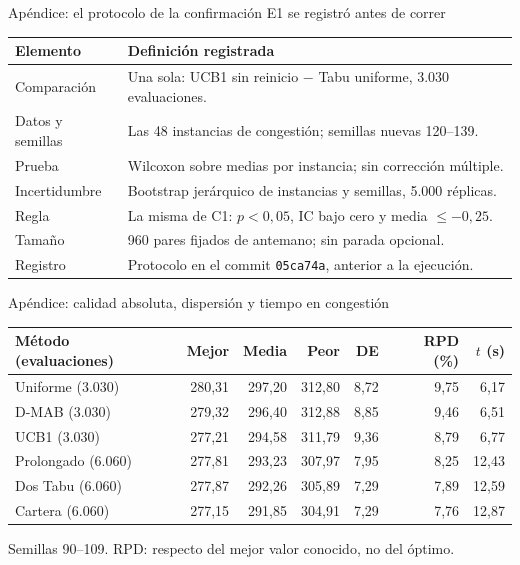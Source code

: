 \documentclass[aspectratio=169,11pt]{beamer}
\begin{document}
\begin{frame}{Apéndice: el protocolo de la confirmación E1 se registró antes de correr}
  \centering\footnotesize
  \begin{tabular}{@{}p{}p{}@{}}
    \toprule
    Elemento & Definición registrada\\
    \midrule
    Comparación & Una sola: UCB1 sin reinicio $-$ Tabu uniforme, 3.030 evaluaciones.\\
    Datos y semillas & Las 48 instancias de congestión; semillas nuevas 120--139.\\
    Prueba & Wilcoxon sobre medias por instancia; sin corrección múltiple.\\
    Incertidumbre & Bootstrap jerárquico de instancias y semillas, 5.000 réplicas.\\
    Regla & La misma de C1: $p<0{,}05$, IC bajo cero y media $\le -0{,}25$.\\
    Tamaño & 960 pares fijados de antemano; sin parada opcional.\\
    Registro & Protocolo en el commit \texttt{05ca74a}, anterior a la ejecución.\\
    \bottomrule
  \end{tabular}
\end{frame}

\begin{frame}{Apéndice: calidad absoluta, dispersión y tiempo en congestión}
  \centering\footnotesize
  \begin{tabular}{@{}lrrrrrr@{}}
    \toprule
    Método (evaluaciones) & Mejor & Media & Peor & DE & RPD (\%) & $t$ (s)\\
    \midrule
    Uniforme (3.030) & 280,31 & 297,20 & 312,80 & 8,72 & 9,75 & 6,17\\
    D-MAB (3.030) & 279,32 & 296,40 & 312,88 & 8,85 & 9,46 & 6,51\\
    UCB1 (3.030) & 277,21 & 294,58 & 311,79 & 9,36 & 8,79 & 6,77\\
    Prolongado (6.060) & 277,81 & 293,23 & 307,97 & 7,95 & 8,25 & 12,43\\
    Dos Tabu (6.060) & 277,87 & 292,26 & 305,89 & 7,29 & 7,89 & 12,59\\
    Cartera (6.060) & 277,15 & 291,85 & 304,91 & 7,29 & 7,76 & 12,87\\
    \bottomrule
  \end{tabular}

  \vspace{0.15cm}
  {\scriptsize Semillas 90--109. RPD: respecto del mejor valor conocido, no del óptimo.}
\end{frame}
\end{document}
